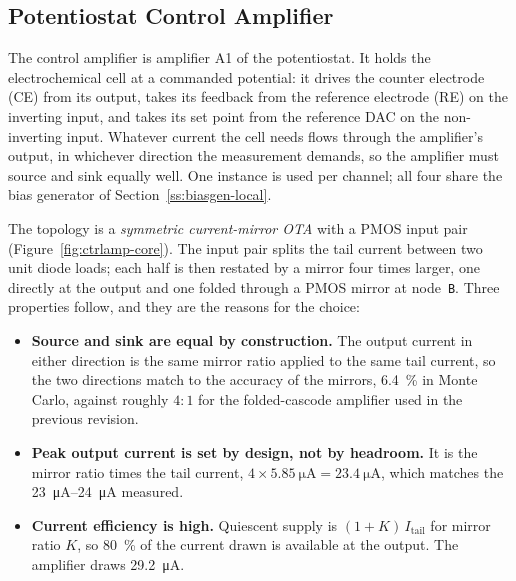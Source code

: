 %
%

\subsection{Potentiostat Control Amplifier}\label{ss:controlamp}

The control amplifier is amplifier A1 of the potentiostat. It holds the electrochemical
cell at a commanded potential: it drives the counter electrode (CE) from its output,
takes its feedback from the reference electrode (RE) on the inverting input, and takes
its set point from the reference DAC on the non-inverting input. Whatever current the
cell needs flows through the amplifier's output, in whichever direction the measurement
demands, so the amplifier must source and sink equally well. One instance is used per
channel; all four share the bias generator of Section~\ref{ss:biasgen-local}.

The topology is a \emph{symmetric current-mirror OTA} with a PMOS input pair
(Figure~\ref{fig:ctrlamp-core}). The input pair splits the tail current between two unit
diode loads; each half is then restated by a mirror four times larger, one directly at
the output and one folded through a PMOS mirror at node~\texttt{B}. Three properties
follow, and they are the reasons for the choice:

\begin{itemize}
\item \textbf{Source and sink are equal by construction.} The output current in either
direction is the same mirror ratio applied to the same tail current, so the two
directions match to the accuracy of the mirrors, \SI{6.4}{\percent} in Monte Carlo,
against roughly \(4{:}1\) for the folded-cascode amplifier used in the previous
revision.
\item \textbf{Peak output current is set by design, not by headroom.} It is the mirror
ratio times the tail current, \(4 \times \SI{5.85}{\micro\ampere} =
\SI{23.4}{\micro\ampere}\), which matches the \SIrange{23}{24}{\micro\ampere} measured.
\item \textbf{Current efficiency is high.} Quiescent supply is \((1+K)\,I_{\mathrm{tail}}\)
for mirror ratio \(K\), so \SI{80}{\percent} of the current drawn is available at the
output. The amplifier draws \SI{29.2}{\micro\ampere}.
\end{itemize}

